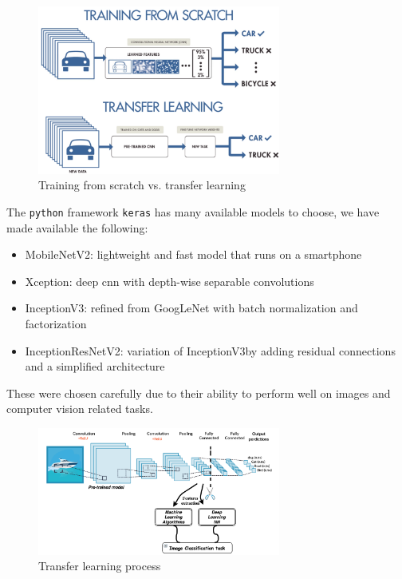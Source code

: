 \documentclass[twocolumn]{article}
\newcommand{\mobilenet}{MobileNetV2}
\newcommand{\xception}{Xception}
\newcommand{\inception}{InceptionV3}
\newcommand{\resnet}{InceptionResNetV2}
\begin{document}
\begin{figure}[h]
\centering
\includegraphics[width=8cm]{./figures/training from scratch vs. transfer learning}
\caption{Training from scratch vs. transfer learning}
\end{figure}

The \texttt{python} framework \texttt{keras} has many available models to 
choose, we have made available the following:
\begin{itemize}
	\item \mobilenet: lightweight and fast model that runs on a smartphone
	\cite{sandler2018mobilenetv2}
	\item \xception: deep \gls{cnn} with depth-wise separable convolutions
	\cite{chollet2017xception}
	\item \inception: refined from GoogLeNet with batch normalization and 
	factorization \cite{szegedy2016rethinking}
	\item \resnet: variation of \inception by adding residual connections and a 
	simplified architecture \cite{szegedy2017inception}
\end{itemize}

These were chosen carefully due to their ability to perform well on images and 
computer vision related tasks.

\begin{figure}[h]
\centering
\includegraphics[width=8cm]{./figures/transfer learning process}
\caption{Transfer learning process}
\end{figure}
\end{document}
